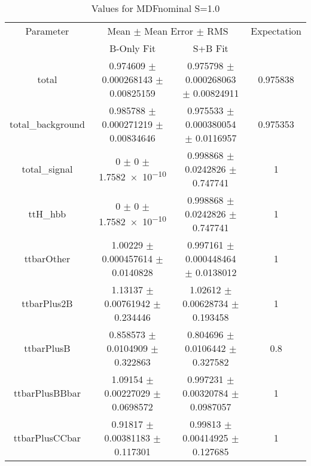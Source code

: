 \begin{table}
\centering
\caption{Values for MDFnominal S=1.0}
\begin{tabular}{cccc}
\toprule
Parameter & \multicolumn{2}{c}{Mean $\pm$ Mean Error $\pm$ RMS} & Expectation\\
 & B-Only Fit & S+B Fit & \\
\midrule
total & \num{0.974609} $\pm$ \num{0.000268143} $\pm$ \num{0.00825159} & \num{0.975798} $\pm$ \num{0.000268063} $\pm$ \num{0.00824911} & \num{0.975838}\\
total\_background & \num{0.985788} $\pm$ \num{0.000271219} $\pm$ \num{0.00834646} & \num{0.975533} $\pm$ \num{0.000380054} $\pm$ \num{0.0116957} & \num{0.975353}\\
total\_signal & \num{0} $\pm$ \num{0} $\pm$ \num{1.7582e-10} & \num{0.998868} $\pm$ \num{0.0242826} $\pm$ \num{0.747741} & \num{1}\\
ttH\_hbb & \num{0} $\pm$ \num{0} $\pm$ \num{1.7582e-10} & \num{0.998868} $\pm$ \num{0.0242826} $\pm$ \num{0.747741} & \num{1}\\
ttbarOther & \num{1.00229} $\pm$ \num{0.000457614} $\pm$ \num{0.0140828} & \num{0.997161} $\pm$ \num{0.000448464} $\pm$ \num{0.0138012} & \num{1}\\
ttbarPlus2B & \num{1.13137} $\pm$ \num{0.00761942} $\pm$ \num{0.234446} & \num{1.02612} $\pm$ \num{0.00628734} $\pm$ \num{0.193458} & \num{1}\\
ttbarPlusB & \num{0.858573} $\pm$ \num{0.0104909} $\pm$ \num{0.322863} & \num{0.804696} $\pm$ \num{0.0106442} $\pm$ \num{0.327582} & \num{0.8}\\
ttbarPlusBBbar & \num{1.09154} $\pm$ \num{0.00227029} $\pm$ \num{0.0698572} & \num{0.997231} $\pm$ \num{0.00320784} $\pm$ \num{0.0987057} & \num{1}\\
ttbarPlusCCbar & \num{0.91817} $\pm$ \num{0.00381183} $\pm$ \num{0.117301} & \num{0.99813} $\pm$ \num{0.00414925} $\pm$ \num{0.127685} & \num{1}\\
\bottomrule
\end{tabular}
\end{table}